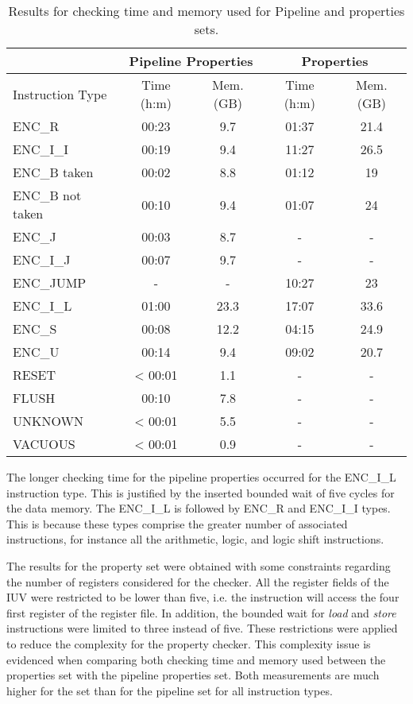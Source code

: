 \begin{table*}[htb!] 
	\centering 
	\caption{Results for checking time and memory used for Pipeline and \SSQED{} properties sets.} 
	\label{tab:pipe-s2qed-check-resutls}
	\begin{tabular}{lcccc}
          & \multicolumn{2}{c}{\textbf{Pipeline Properties}} & \multicolumn{2}{c}{\textbf{\SSQED{} Properties}} \\
          \hline
         Instruction Type & Time (h:m) & Mem.(GB) & Time (h:m) & Mem.(GB)  \\
          \hline
        ENC\_R & 00:23 & 9.7 & 01:37 &  21.4  \\
        ENC\_I\_I & 00:19 & 9.4 & 11:27 &  26.5\\
        ENC\_B taken  & 00:02 & 8.8 & 01:12 & 19\\
        ENC\_B not taken & 00:10 & 9.4 & 01:07 &  24  \\
        ENC\_J & 00:03 & 8.7 & - &  -  \\
        ENC\_I\_J & 00:07 & 9.7 & - &  -  \\
        ENC\_JUMP & - & - & 10:27 &  23  \\
        ENC\_I\_L & 01:00 & 23.3 & 17:07 & 33.6  \\
        ENC\_S & 00:08 & 12.2 & 04:15 &  24.9  \\
        ENC\_U & 00:14 & 9.4 & 09:02 & 20.7  \\
        RESET & < 00:01 & 1.1 & - &  -  \\
        FLUSH & 00:10 & 7.8 & - &  -  \\
        UNKNOWN & < 00:01 & 5.5 & - &  -  \\
        VACUOUS & < 00:01 & 0.9 & - &  -  \\
\end{tabular}
\end{table*}

The longer checking time for the pipeline properties occurred for the ENC\_I\_L instruction type. This is justified by the inserted bounded wait of five cycles for the data memory. The ENC\_I\_L is followed by ENC\_R and ENC\_I\_I types. This is because these types comprise the greater number of associated instructions, for instance all the arithmetic, logic, and logic shift instructions.

The results for the \SSQED{} property set were obtained with some constraints regarding the number of registers considered for the checker. All the register fields of the IUV were restricted to be lower than five, i.e. the instruction will access the four first register of the register file. In addition, the bounded wait for \textit{load} and \textit{store} instructions were limited to three instead of five. These restrictions were applied to reduce the complexity for the property checker. This complexity issue is evidenced when comparing both checking time and memory used between the \SSQED{} properties set with the pipeline properties set. Both measurements are much higher for the \SSQED{} set than for the pipeline set for all instruction types.

